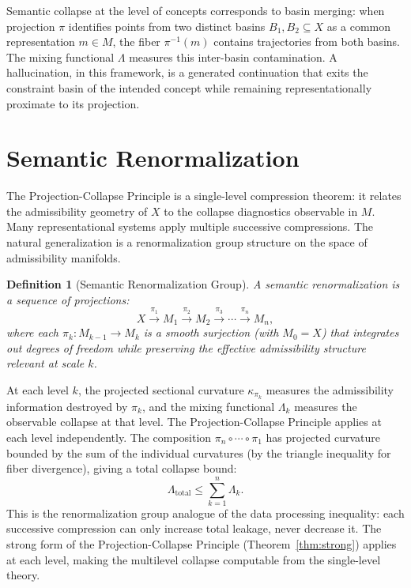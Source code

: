 \documentclass[12pt, oneside]{book}
\theoremstyle{plain-flyxion}
\theoremstyle{definition-flyxion}
\newtheorem{definition}[theorem]{Definition}
\newcommand{\Lam}{\Lambda}
\begin{document}
Semantic collapse at the level of concepts corresponds to basin merging: when projection
$\pi$ identifies points from two distinct basins $B_1, B_2 \subseteq X$ as a common
representation $m \in M$, the fiber $\pi^{-1}(m)$ contains trajectories from both
basins. The mixing functional $\Lam$ measures this inter-basin contamination. A
hallucination, in this framework, is a generated continuation that exits the constraint
basin of the intended concept while remaining representationally proximate to its
projection.

\section{Semantic Renormalization}

The Projection-Collapse Principle is a single-level compression theorem: it relates
the admissibility geometry of $X$ to the collapse diagnostics observable in $M$. Many
representational systems apply multiple successive compressions. The natural generalization
is a renormalization group structure on the space of admissibility manifolds.

\begin{definition}[Semantic Renormalization Group]\label{def:renorm}
A \emph{semantic renormalization} is a sequence of projections:
\begin{equation}\label{eq:renorm}
X \xrightarrow{\pi_1} M_1 \xrightarrow{\pi_2} M_2 \xrightarrow{\pi_3} \cdots
\xrightarrow{\pi_n} M_n,
\end{equation}
where each $\pi_k: M_{k-1} \to M_k$ is a smooth surjection (with $M_0 = X$) that
integrates out degrees of freedom while preserving the effective admissibility structure
relevant at scale $k$.
\end{definition}

At each level $k$, the projected sectional curvature $\kappa_{\pi_k}$ measures the
admissibility information destroyed by $\pi_k$, and the mixing functional $\Lam_k$
measures the observable collapse at that level. The Projection-Collapse Principle applies
at each level independently. The composition $\pi_n \circ \cdots \circ \pi_1$ has
projected curvature bounded by the sum of the individual curvatures (by the triangle
inequality for fiber divergence), giving a total collapse bound:
\[
\Lam_{\mathrm{total}} \leq \sum_{k=1}^n \Lam_k.
\]
This is the renormalization group analogue of the data processing inequality: each
successive compression can only increase total leakage, never decrease it. The strong
form of the Projection-Collapse Principle (Theorem~\ref{thm:strong}) applies at each
level, making the multilevel collapse computable from the single-level theory.
\end{document}
